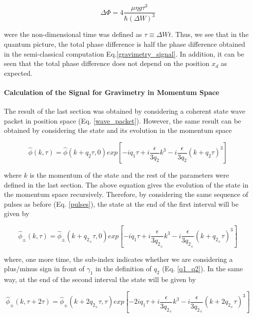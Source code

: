 \documentclass{article}
\begin{document}
\begin{equation}\label{quantum_gravimetry_signal}
\Delta \Phi = 4 \frac{\mu \eta g \tau^{3}}{\hbar (\Delta W)^{3}}
\end{equation}

were the non-dimensional time was defined as $\tau\equiv \Delta W t$. Thus, we see that in the quantum picture, the total phase difference is half the phase difference obtained in the semi-classical computation Eq.\ref{gravimetry_signal}. In addition, it can be seen that the total phase difference does not depend on the position $x_{d}$ as expected.

\paragraph{Calculation of the Signal for Gravimetry in Momentum Space}
The result of the last section was obtained by considering a coherent state wave packet in position space (Eq. \ref{wave_packet}). However, the same result can be obtained by considering the state and its evolution in the momentum space \cite{Castanos2014}

\begin{equation}
\widehat{\phi}(k, \tau) = \widehat{\phi}(k + q_{2}\tau, 0) exp\left[-i q_{1} \tau + i \frac{\epsilon}{3q_{2}} k^{3} - i \frac{\epsilon}{3q_{2}} (k + q_{2} \tau)^{3} \right]
\end{equation}

where $k$ is the momentum of the state and the rest of the parameters were defined in the last section. The above equation gives the evolution of the state in the momentum space recursively. Therefore, by considering the same sequence of pulses as before (Eq. \ref{pulses}), the state at the end of the first interval will be given by

\begin{equation}\label{state_t1_momentum_space}
\widehat{\phi}_{\pm}(k, \tau) = \widehat{\phi}_{\pm}(k + q_{2_{\pm}}\tau, 0) exp\left[-i q_{1} \tau + i \frac{\epsilon}{3q_{2_{\pm}}} k^{3} - i \frac{\epsilon}{3q_{2_{\pm}}} (k + q_{2_{\pm}} \tau)^{3} \right]
\end{equation}

where, one more time, the sub-index indicates whether we are considering a plus/minus sign in front of $\gamma_{1}$ in the definition of $q_{2}$ (Eq. \ref{q1_q2}). In the same way, at the end of the second interval the state will be given by

\begin{equation}\label{state_t2_momentum_space}
\widehat{\phi}_{\pm}(k, \tau+2\tau) = \widehat{\phi}_{\pm}(k + 2q_{2_{\mp}}\tau, \tau) exp\left[-2i q_{1} \tau + i \frac{\epsilon}{3q_{2_{\mp}}} k^{3} - i \frac{\epsilon}{3q_{2_{\mp}}} (k + 2q_{2_{\mp}} \tau)^{3} \right]
\end{equation}
\end{document}
